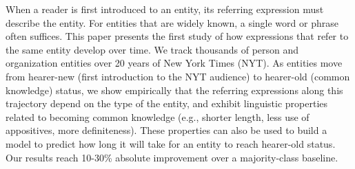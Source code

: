 When a reader is first introduced to an entity, its referring expression must describe the entity. For entities that are widely known, a single word or phrase often suffices. This paper presents the first study of how expressions that refer to the same entity develop over time. We track thousands of person and organization entities over 20 years of New York Times (NYT). As entities move from hearer-new (first introduction to the NYT audience) to hearer-old (common knowledge) status, we show empirically that the referring expressions along this trajectory depend on the type of the entity, and exhibit linguistic properties related to becoming common knowledge (e.g., shorter length, less use of appositives, more definiteness). These properties can also be used to build a model to predict how long it will take for an entity to reach hearer-old status. Our results reach 10-30\% absolute improvement over a majority-class baseline.
